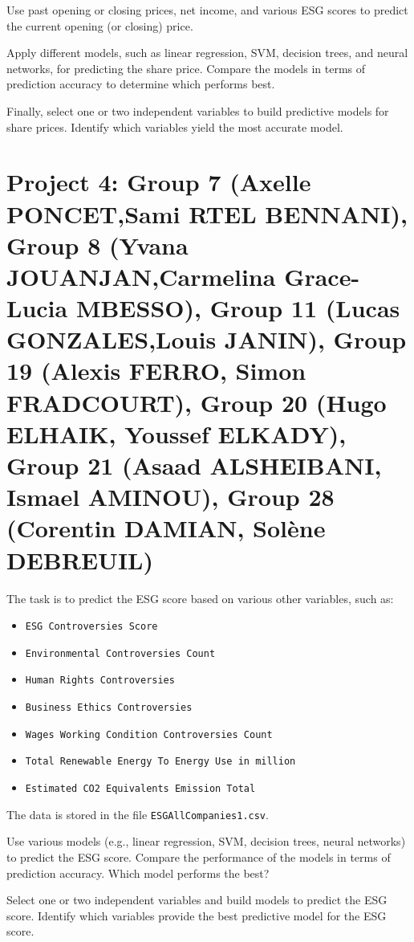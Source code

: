 \documentclass{article}
\begin{document}
Use past opening or closing prices, net income, and various ESG scores to predict the current opening (or closing) price.

Apply different models, such as linear regression, SVM, decision trees, and neural networks, for predicting the share price. Compare the models in terms of prediction accuracy to determine which performs best.

Finally, select one or two independent variables to build predictive models for share prices. Identify which variables yield the most accurate model. 



 \section*{Project 4:  Group 7 (Axelle	PONCET,Sami	RTEL BENNANI), 
 Group 8 (Yvana	JOUANJAN,Carmelina Grace-Lucia	MBESSO), 
Group 11 (Lucas	GONZALES,Louis	JANIN),
  Group 19 (Alexis	FERRO, Simon	FRADCOURT),
  Group 20 (Hugo ELHAIK, Youssef ELKADY), 
  Group 21 (Asaad	ALSHEIBANI, Ismael	AMINOU), 
Group 28 (Corentin	DAMIAN, Solène	DEBREUIL)
 }
The task is to predict the ESG score based on various other variables, such as: \begin{itemize} \item \lstinline$ESG Controversies Score$ \item \lstinline$Environmental Controversies Count$ \item \lstinline$Human Rights Controversies$ \item \lstinline$Business Ethics Controversies$ \item \lstinline$Wages Working Condition Controversies Count$ \item \lstinline$Total Renewable Energy To Energy Use in million$ \item \lstinline$Estimated CO2 Equivalents Emission Total$ \end{itemize}

The data is stored in the file \lstinline$ESGAllCompanies1.csv$.

Use various models (e.g., linear regression, SVM, decision trees, neural networks) to predict the ESG score. Compare the performance of the models in terms of prediction accuracy. Which model performs the best?

Select one or two independent variables and build models to predict the ESG score. Identify which variables provide the best predictive model for the ESG score. 
\end{document}
